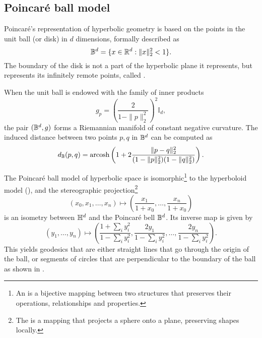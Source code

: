 \subsection{Poincaré ball model}\label{sec:poincareBall}
Poincaré's representation of hyperbolic geometry is based on the points in the unit ball (or disk) in $d$ dimensions, formally described as
\begin{equation*}
    \mathbb{B}^d = \{x \in \mathbb{R}^d: \|x\|^2_2 < 1\}.
\end{equation*}
The boundary of the disk is not a part of the hyperbolic plane it represents, but represents its infinitely remote points, called .

When the unit ball is endowed with the family of inner products
\begin{equation*}
    g_p = \left(\frac{2}{1-\|p\|^2_2}\right)^2\mathbb{I}_d,
\end{equation*}
the pair $(\mathbb{B}^d,g)$ forms a Riemannian manifold of constant negative curvature. The induced distance between two points $p,q$ in $\mathbb{B}^d$ can be computed as
\begin{equation*}
    d_{\mathbb{B}}(p,q) = \text{arcosh}\left(1 + 2\frac{\|p-q\|^2_2}{(1-\|p\|^2_2)(1-\|q\|^2_2)}\right).
\end{equation*}




The Poincaré ball model of hyperbolic space is isomorphic\footnote{An  is a bijective mapping between two structures that preserves their operations, relationships and properties.} to the hyperboloid model (), and the stereographic projection\footnote{The  is a mapping that projects a sphere onto a plane, preserving shapes locally.}
\begin{equation*}
    (x_0, x_1, \ldots, x_n) \mapsto \left(\frac{x_1}{1+x_0}, \ldots, \frac{x_n}{1+x_0}\right)
\end{equation*}
is an isometry between $\mathbb{H}^d$ and the Poincaré bell $\mathbb{B}^d$. Its inverse map is given by
\begin{equation*}
    (y_1, \ldots, y_n) \mapsto \left(\frac{1 + \sum_i y_i^2}{1 - \sum_i y_i^2}, \frac{2y_1}{1 - \sum_i y_i^2}, \ldots, \frac{2y_n}{1 - \sum_i y_i^2}\right).
\end{equation*}
This yields geodesics that are either straight lines that go through the origin of the ball, or segments of circles that are perpendicular to the boundary of the ball as shown in .

